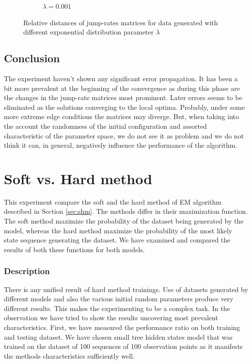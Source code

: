 \documentclass[thesis=M,english]{FITthesis}[2012/10/20]
\begin{document}
\begin{figure}
\begin{subfigure}{.7\textwidth}
  \caption{$\lambda = 0.001$}
  \label{fig:l3}
\end{subfigure}
\caption{Relative distances of jump-rates matrices for data generated with different exponential distribution parameter $\lambda$}
\label{fig:test}
\end{figure}

\subsection*{ Conclusion }
The experiment haven't shown any significant error propagation. It has been a bit more prevalent at the beginning of the convergence as during this phase are the changes in the jump-rate matrices most prominent. Later errors seems to be eliminated as the solutions converging to the local optima. Probably, under some more extreme edge conditions the matrices may diverge. But, when taking into the account the randomness of the initial configuration and assorted characteristic of the parameter space, we do not see it as problem and we do not think it can, in general, negatively influence the performance of the algorithm. %

\section{Soft vs. Hard method}

This experiment compare the soft and the hard method of EM algorithm described in Section \ref{sec:shm}. The methods differ in their maximization function. The soft method maximize the probability of the dataset being generated by the model, whereas the hard method maximize the probability of the most likely state sequence generating the dataset. We have examined and compared the results of both these functions for both models.   

\subsubsection*{ Description }

There is any unified result of hard method trainings. Use of datasets generated by different models and also the various initial random parameters produce very different results. This makes the experimenting to be a complex task. In the observation we have tried to show the results uncovering most prevalent characteristics. First, we have measured the performance ratio on both training and testing dataset. We have chosen small tree hidden states model that was trained on the dataset of 100 sequences of 100 observation points as it manifests the methods characteristics sufficiently well.    
\end{document}
